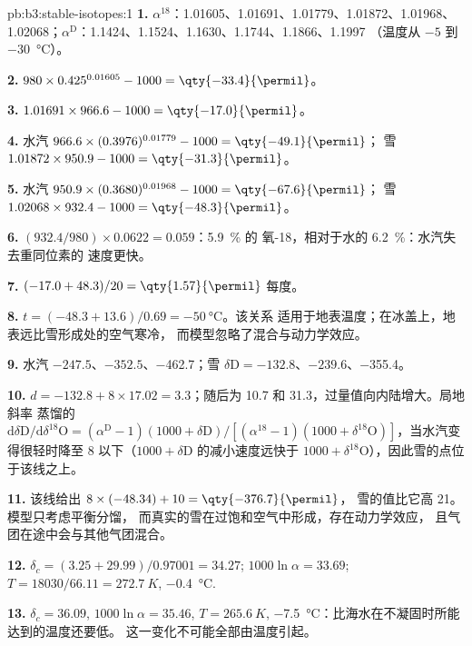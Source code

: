 \begin{solution}{pb:b3:stable-isotopes:1}
\textbf{1.} $\alpha^{18}$：1.01605、1.01691、1.01779、1.01872、1.01968、
1.02068；$\alpha^{\mathrm D}$：1.1424、1.1524、1.1630、1.1744、1.1866、1.1997
（温度从 $-5$ 到 \qty{-30}{\celsius}）。

\textbf{2.} $980\times0.425^{0.01605} - 1000 = \qty{-33.4}{\permil}$。

\textbf{3.} $1.01691\times966.6 - 1000 = \qty{-17.0}{\permil}$。

\textbf{4.} 水汽 $966.6\times(0.3976)^{0.01779} - 1000 = \qty{-49.1}{\permil}$；
雪 $1.01872\times950.9 - 1000 = \qty{-31.3}{\permil}$。

\textbf{5.} 水汽 $950.9\times(0.3680)^{0.01968} - 1000 = \qty{-67.6}{\permil}$；
雪 $1.02068\times932.4 - 1000 = \qty{-48.3}{\permil}$。

\textbf{6.} $(932.4/980)\times0.0622 = 0.059$：\qty{5.9}{\percent} 的
氧-18，相对于水的 \qty{6.2}{\percent}：水汽失去重同位素的
速度更快。

\textbf{7.} $(-17.0 + 48.3)/20 = \qty{1.57}{\permil}$ 每度。

\textbf{8.} $t = (-48.3 + 13.6)/0.69 = \qty{-50}{\celsius}$。该关系
适用于地表温度；在冰盖上，地表远比雪形成处的空气寒冷，
而模型忽略了混合与动力学效应。

\textbf{9.} 水汽 $-247.5$、$-352.5$、\qty{-462.7}{\permil}；雪 $\delta\mathrm D
= -132.8$、$-239.6$、\qty{-355.4}{\permil}。

\textbf{10.} $d = -132.8 + 8\times17.02 = 3.3$；随后为 10.7 和
\qty{31.3}{\permil}，过量值向内陆增大。局地斜率
蒸馏的 $\mathrm d\delta\mathrm D/\mathrm d\delta^{18}\mathrm O = (\alpha^{\mathrm D} -
1)(1000 + \delta\mathrm D)/[(\alpha^{18} - 1)(1000 + \delta^{18}\mathrm O)]$，当水汽变得很轻时降至
8 以下（$1000 + \delta\mathrm D$ 的减小速度远快于
$1000 + \delta^{18}\mathrm O$），因此雪的点位于该线之上。

\textbf{11.} 该线给出 $8\times(-48.34) + 10 = \qty{-376.7}{\permil}$，
雪的值比它高 \qty{21}{\permil}。模型只考虑平衡分馏，
而真实的雪在过饱和空气中形成，存在动力学效应，
且气团在途中会与其他气团混合。

\textbf{12.} $\delta_c = (3.25 + 29.99)/0.97001 = 34.27$; $1000\ln\alpha =
33.69$; $T = 18030/66.11 = \qty{272.7}{K}$, \qty{-0.4}{\celsius}.

\textbf{13.} $\delta_c = 36.09$, $1000\ln\alpha = 35.46$, $T = \qty{265.6}{K}$,
\qty{-7.5}{\celsius}：比海水在不凝固时所能达到的温度还要低。
这一变化不可能全部由温度引起。


\end{solution}
